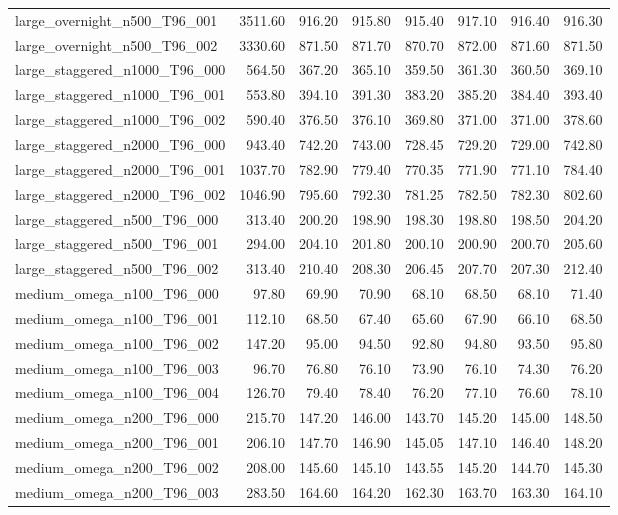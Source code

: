\begin{table}[htbp]
\begin{tabular}{lrrrrrrr}
large\_overnight\_n500\_T96\_001 & 3511.60 & 916.20 & 915.80 & 915.40 & 917.10 & 916.40 & 916.30 \\
large\_overnight\_n500\_T96\_002 & 3330.60 & 871.50 & 871.70 & 870.70 & 872.00 & 871.60 & 871.50 \\
large\_staggered\_n1000\_T96\_000 & 564.50 & 367.20 & 365.10 & 359.50 & 361.30 & 360.50 & 369.10 \\
large\_staggered\_n1000\_T96\_001 & 553.80 & 394.10 & 391.30 & 383.20 & 385.20 & 384.40 & 393.40 \\
large\_staggered\_n1000\_T96\_002 & 590.40 & 376.50 & 376.10 & 369.80 & 371.00 & 371.00 & 378.60 \\
large\_staggered\_n2000\_T96\_000 & 943.40 & 742.20 & 743.00 & 728.45 & 729.20 & 729.00 & 742.80 \\
large\_staggered\_n2000\_T96\_001 & 1037.70 & 782.90 & 779.40 & 770.35 & 771.90 & 771.10 & 784.40 \\
large\_staggered\_n2000\_T96\_002 & 1046.90 & 795.60 & 792.30 & 781.25 & 782.50 & 782.30 & 802.60 \\
large\_staggered\_n500\_T96\_000 & 313.40 & 200.20 & 198.90 & 198.30 & 198.80 & 198.50 & 204.20 \\
large\_staggered\_n500\_T96\_001 & 294.00 & 204.10 & 201.80 & 200.10 & 200.90 & 200.70 & 205.60 \\
large\_staggered\_n500\_T96\_002 & 313.40 & 210.40 & 208.30 & 206.45 & 207.70 & 207.30 & 212.40 \\
medium\_omega\_n100\_T96\_000 & 97.80 & 69.90 & 70.90 & 68.10 & 68.50 & 68.10 & 71.40 \\
medium\_omega\_n100\_T96\_001 & 112.10 & 68.50 & 67.40 & 65.60 & 67.90 & 66.10 & 68.50 \\
medium\_omega\_n100\_T96\_002 & 147.20 & 95.00 & 94.50 & 92.80 & 94.80 & 93.50 & 95.80 \\
medium\_omega\_n100\_T96\_003 & 96.70 & 76.80 & 76.10 & 73.90 & 76.10 & 74.30 & 76.20 \\
medium\_omega\_n100\_T96\_004 & 126.70 & 79.40 & 78.40 & 76.20 & 77.10 & 76.60 & 78.10 \\
medium\_omega\_n200\_T96\_000 & 215.70 & 147.20 & 146.00 & 143.70 & 145.20 & 145.00 & 148.50 \\
medium\_omega\_n200\_T96\_001 & 206.10 & 147.70 & 146.90 & 145.05 & 147.10 & 146.40 & 148.20 \\
medium\_omega\_n200\_T96\_002 & 208.00 & 145.60 & 145.10 & 143.55 & 145.20 & 144.70 & 145.30 \\
medium\_omega\_n200\_T96\_003 & 283.50 & 164.60 & 164.20 & 162.30 & 163.70 & 163.30 & 164.10 \\

\end{tabular}
\end{table}
